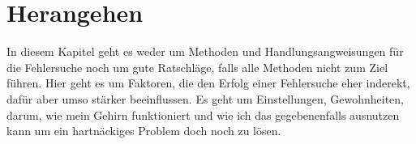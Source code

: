 \chapter{Herangehen}
\label{cha:herangehen}

\begin{abstractsec}
  In diesem Kapitel geht es weder um Methoden und Handlungsangweisungen für
  die Fehlersuche noch um gute Ratschläge, falls alle Methoden nicht zum Ziel
  führen. Hier geht es um Faktoren, die den Erfolg einer Fehlersuche eher
  inderekt, dafür aber umso stärker beeinflussen. Es geht um Einstellungen,
  Gewohnheiten, darum, wie mein Gehirn funktioniert und wie ich das
  gegebenenfalls ausnutzen kann um ein hartnäckiges Problem doch noch zu
  lösen.
\end{abstractsec}







